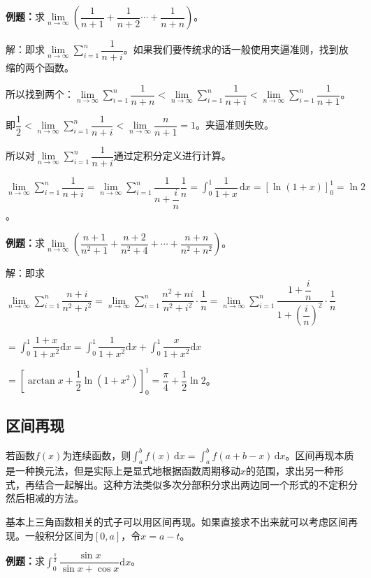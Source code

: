 \documentclass[UTF8, 12pt]{ctexart}
\begin{document}
\textbf{例题：}求$\lim\limits_{n\to\infty}\left(\dfrac{1}{n+1}+\dfrac{1}{n+2}\cdots+\dfrac{1}{n+n}\right)$。

解：即求$\lim\limits_{n\to\infty}\sum\limits_{i=1}^n\dfrac{1}{n+i}$。如果我们要传统求的话一般使用夹逼准则，找到放缩的两个函数。

所以找到两个：$\lim\limits_{n\to\infty}\sum\limits_{i=1}^n\dfrac{1}{n+n}<\lim\limits_{n\to\infty}\sum\limits_{i=1}^n\dfrac{1}{n+i}<\lim\limits_{n\to\infty}\sum\limits_{i=1}^n\dfrac{1}{n+1}$。

即$\dfrac{1}{2}<\lim\limits_{n\to\infty}\sum\limits_{i=1}^n\dfrac{1}{n+i}<\lim\limits_{n\to\infty}\dfrac{n}{n+1}=1$。夹逼准则失败。

所以对$\lim\limits_{n\to\infty}\sum\limits_{i=1}^n\dfrac{1}{n+i}$通过定积分定义进行计算。

$\lim\limits_{n\to\infty}\sum\limits_{i=1}^n\dfrac{1}{n+i}=\lim\limits_{n\to\infty}\sum\limits_{i=1}^n\dfrac{1}{n+\dfrac{i}{n}}\dfrac{1}{n}=\displaystyle{\int_0^1\dfrac{1}{1+x}\,\textrm{d}x}=[\ln(1+x)]_0^1=\ln2$。

\textbf{例题：}求$\lim\limits_{n\to\infty}\left(\dfrac{n+1}{n^2+1}+\dfrac{n+2}{n^2+4}+\cdots+\dfrac{n+n}{n^2+n^2}\right)$。

解：即求$\lim\limits_{n\to\infty}\sum\limits_{i=1}^n\dfrac{n+i}{n^2+i^2}=\lim\limits_{n\to\infty}\sum\limits_{i=1}^n\dfrac{n^2+ni}{n^2+i^2}\cdot\dfrac{1}{n}=\lim\limits_{n\to\infty}\sum\limits_{i=1}^n\dfrac{1+\dfrac{i}{n}}{1+\left(\dfrac{i}{n}\right)^2}\cdot\dfrac{1}{n}$

$=\displaystyle{\int_0^1\dfrac{1+x}{1+x^2}\textrm{d}x}=\displaystyle{\int_0^1\dfrac{1}{1+x^2}\textrm{d}x+\int_0^1\dfrac{x}{1+x^2}\textrm{d}x}$

$=\left[\arctan x+\dfrac{1}{2}\ln(1+x^2)\right]_0^1=\dfrac{\pi}{4}+\dfrac{1}{2}\ln2$。

\subsection{区间再现}

若函数$f(x)$为连续函数，则$\int_a^bf(x)\,\textrm{d}x=\int_a^bf(a+b-x)\,\textrm{d}x$。区间再现本质是一种换元法，但是实际上是显式地根据函数周期移动$x$的范围，求出另一种形式，再结合一起解出。这种方法类似多次分部积分求出两边同一个形式的不定积分然后相减的方法。

基本上三角函数相关的式子可以用区间再现。如果直接求不出来就可以考虑区间再现。一般积分区间为$[0,a]$，令$x=a-t$。

\textbf{例题：}求$\displaystyle{\int_0^\frac{\pi}{2}\dfrac{\sin x}{\sin x+\cos x}\textrm{d}x}$。
\end{document}
